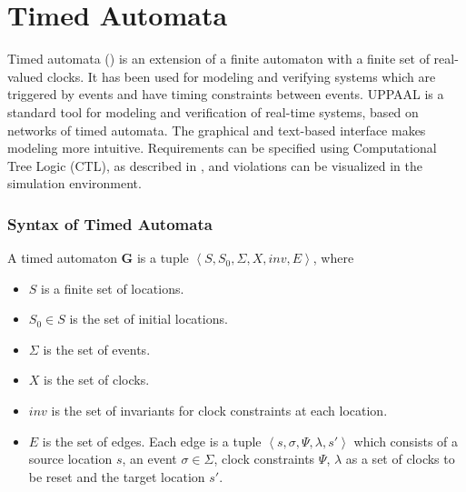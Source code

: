 %
%

\section{Timed Automata}
Timed automata (\cite{timed_automata}) is an extension of a finite automaton with a finite set of real-valued clocks. It has been used for modeling and verifying systems which are triggered by events and have timing constraints between events.  UPPAAL is a standard tool for modeling and verification of real-time systems, based on networks of timed automata. The graphical and text-based interface makes modeling more intuitive. Requirements can be specified using Computational Tree Logic (CTL), as described in \cite{Clarke}, and violations can be visualized in the simulation environment.

\subsubsection{Syntax of Timed Automata}
A timed automaton \textbf{G} is a tuple $\left\langle S,S_0,\Sigma,X,inv,E\right\rangle$, where

\begin{itemize}
	\item $S$ is a finite set of locations.
	\item $S_0\in S$ is the set of initial locations.
	\item $\Sigma$ is the set of events.
	\item $X$ is the set of clocks.
	\item $inv$ is the set of invariants for clock constraints at each location.
	\item $E$ is the set of edges. Each edge is a tuple $\left\langle s,\sigma,\Psi,\lambda,s'\right\rangle$ which consists of a source location $s$, an event $\sigma\in\Sigma$, clock constraints $\Psi$, $\lambda$ as a set of clocks to be reset and the target location $s'$.   
\end{itemize}

